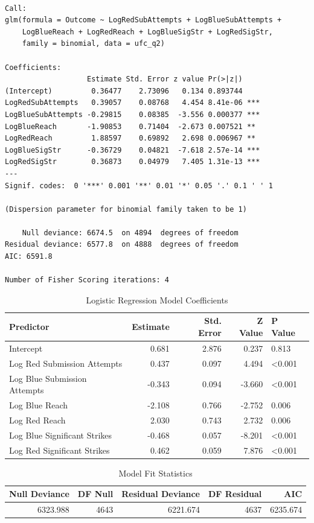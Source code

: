 \documentclass[
  letterpaper,
  DIV=11,
  numbers=noendperiod]{scrartcl}
\begin{document}
\begin{verbatim}

Call:
glm(formula = Outcome ~ LogRedSubAttempts + LogBlueSubAttempts + 
    LogBlueReach + LogRedReach + LogBlueSigStr + LogRedSigStr, 
    family = binomial, data = ufc_q2)

Coefficients:
                   Estimate Std. Error z value Pr(>|z|)    
(Intercept)         0.36477    2.73096   0.134 0.893744    
LogRedSubAttempts   0.39057    0.08768   4.454 8.41e-06 ***
LogBlueSubAttempts -0.29815    0.08385  -3.556 0.000377 ***
LogBlueReach       -1.90853    0.71404  -2.673 0.007521 ** 
LogRedReach         1.88597    0.69892   2.698 0.006967 ** 
LogBlueSigStr      -0.36729    0.04821  -7.618 2.57e-14 ***
LogRedSigStr        0.36873    0.04979   7.405 1.31e-13 ***
---
Signif. codes:  0 '***' 0.001 '**' 0.01 '*' 0.05 '.' 0.1 ' ' 1

(Dispersion parameter for binomial family taken to be 1)

    Null deviance: 6674.5  on 4894  degrees of freedom
Residual deviance: 6577.8  on 4888  degrees of freedom
AIC: 6591.8

Number of Fisher Scoring iterations: 4
\end{verbatim}

\begin{longtable}[t]{lrrrl}
\caption{Logistic Regression Model Coefficients}\\
\toprule
Predictor & Estimate & Std. Error & Z Value & P Value\\
\midrule
Intercept & 0.681 & 2.876 & 0.237 & 0.813\\
Log Red Submission Attempts & 0.437 & 0.097 & 4.494 & <0.001\\
Log Blue Submission Attempts & -0.343 & 0.094 & -3.660 & <0.001\\
Log Blue Reach & -2.108 & 0.766 & -2.752 & 0.006\\
Log Red Reach & 2.030 & 0.743 & 2.732 & 0.006\\
\addlinespace
Log Blue Significant Strikes & -0.468 & 0.057 & -8.201 & <0.001\\
Log Red Significant Strikes & 0.462 & 0.059 & 7.876 & <0.001\\
\bottomrule
\end{longtable}

\begin{longtable}[t]{rrrrr}
\caption{Model Fit Statistics}\\
\toprule
Null Deviance & DF Null & Residual Deviance & DF Residual & AIC\\
\midrule
6323.988 & 4643 & 6221.674 & 4637 & 6235.674\\
\bottomrule
\end{longtable}
\end{document}
